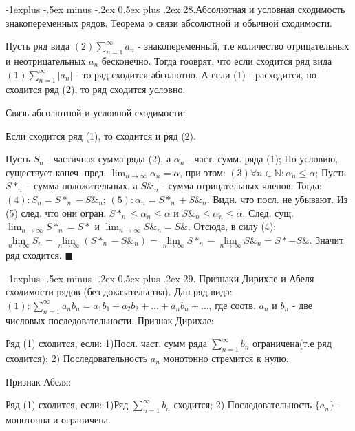 \documentclass[unicode,10pt, landscape]{article}
\makeatletter
\renewcommand{\subsection}{\@startsection{subsection}{2}{0mm}%
                                {-1explus -.5ex minus -.2ex}%
                                {0.5ex plus .2ex}%
                                {\normalfont\normalsize\bfseries}}
\newenvironment{Proof} %
{\par\noindent{\bf Док-во:}} %
{\hfill$\scriptstyle\blacksquare$}
\makeatother
\begin{document}
\begin{multicols}{2}
\subsection{28.Абсолютная и условная сходимость знакопеременных рядов. Теорема о связи абсолютной и обычной сходимости.}
\begin{Def}
Пусть ряд вида $(2) \sum_{n=1}^\infty a_n$ - знакопеременный, т.е количество отрицательных и неотрицательных $a_n$ бесконечно. Тогда гооврят, что если сходится ряд вида $(1) \sum_{n=1}^\infty |a_n|$ - то ряд сходится абсолютно. А если (1) - расходится, но сходится ряд (2), то ряд сходится условно.
\end{Def}
Связь абсолютной и условной сходимости:
\begin{Th}
Если сходится ряд (1), то сходится и ряд (2).
\begin{Proof}
Пусть $S_n$ - частичная сумма ряда (2), а $\alpha_n$ - част. сумм. ряда (1); По условию, существует конеч. пред. $\lim_{n \to \infty} \alpha_n = \alpha$, при этом: $(3)\forall n \in \mathbb{N}: \alpha_n \leq \alpha$; Пусть $S*_n$ - сумма положительных, а $S\&_n$ - сумма отрицательных членов. Тогда: $(4): S_n = S*_n - S\&_n$; $(5): \alpha_n = S*_n + S\&_n$. Видн. что посл. не убывают. Из (5) след. что они огран. $S*_n \leq \alpha_n \leq \alpha$ и $S\&_n \leq \alpha_n \leq \alpha$. След. сущ. $\lim_{n \to \infty} S*_n = S*$ и $\lim_{n \to \infty} S\&_n = S\&$. Отсюда, в силу (4):$\lim\limits_{n\rightarrow\infty }S_{n}=\lim\limits_{n\rightarrow\infty }(S*_{n}-S\&_{n})=\lim\limits_{n\rightarrow\infty }S*_{n}-\lim\limits_{n\rightarrow\infty }S\&_{n}=S*-S\&$. Значит ряд сходится.
\end{Proof}
\end{Th}


\subsection{29. Признаки Дирихле и Абеля сходимости рядов (без доказательства).}
Дан ряд вида: $(1): \sum\limits_{n=1}^{\infty}a_{n}b_{n}=a_{1}b_{1}+a_{2}b_{2}+…+a_{n}b_{n}+…$, где соотв. $a_n$ и $b_n$ - две числовых последовательности.
Признак Дирихле:
\begin{Th}
Ряд (1) сходится, если: 1)Посл. част. сумм ряда $\sum_{n=1}^\infty b_n$ ограничена(т.е ряд сходится);
2) Последовательность $a_n$ монотонно стремится к нулю.
\end{Th}
Признак Абеля:
\begin{Th}
Ряд (1) сходится, если: 1)Ряд $\sum_{n=1}^\infty b_n$ сходится; 2) Последовательность $\{a_n\}$ - монотонна и ограничена.
\end{Th}


\end{multicols}
\end{document}
